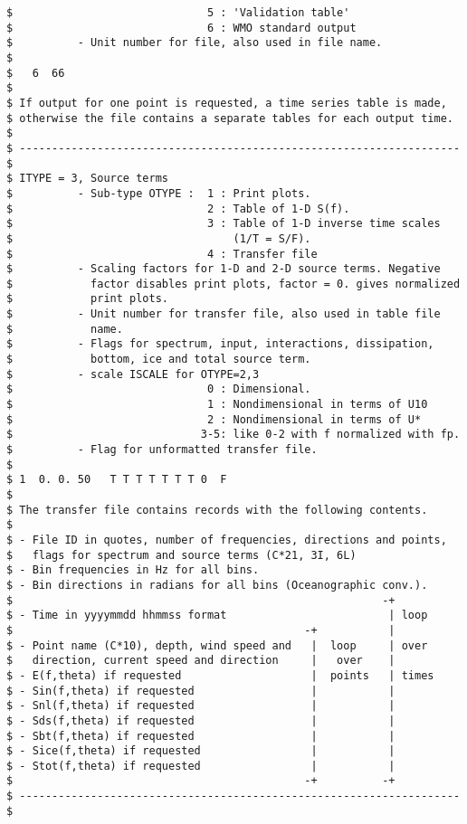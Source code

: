 \begin{footnotesize}
\begin{verbatim}
$                              5 : 'Validation table'
$                              6 : WMO standard output 
$          - Unit number for file, also used in file name.
$
$   6  66
$
$ If output for one point is requested, a time series table is made,
$ otherwise the file contains a separate tables for each output time.
$
$ -------------------------------------------------------------------- $
$ ITYPE = 3, Source terms
$          - Sub-type OTYPE :  1 : Print plots.
$                              2 : Table of 1-D S(f).
$                              3 : Table of 1-D inverse time scales
$                                  (1/T = S/F).
$                              4 : Transfer file
$          - Scaling factors for 1-D and 2-D source terms. Negative
$            factor disables print plots, factor = 0. gives normalized
$            print plots.
$          - Unit number for transfer file, also used in table file
$            name.
$          - Flags for spectrum, input, interactions, dissipation,
$            bottom, ice and total source term.
$          - scale ISCALE for OTYPE=2,3
$                              0 : Dimensional.
$                              1 : Nondimensional in terms of U10
$                              2 : Nondimensional in terms of U*
$                             3-5: like 0-2 with f normalized with fp.
$          - Flag for unformatted transfer file.
$
$ 1  0. 0. 50   T T T T T T T 0  F
$
$ The transfer file contains records with the following contents.
$
$ - File ID in quotes, number of frequencies, directions and points,
$   flags for spectrum and source terms (C*21, 3I, 6L)
$ - Bin frequencies in Hz for all bins.
$ - Bin directions in radians for all bins (Oceanographic conv.).
$                                                         -+
$ - Time in yyyymmdd hhmmss format                         | loop
$                                             -+           |
$ - Point name (C*10), depth, wind speed and   |  loop     | over
$   direction, current speed and direction     |   over    |
$ - E(f,theta) if requested                    |  points   | times
$ - Sin(f,theta) if requested                  |           |
$ - Snl(f,theta) if requested                  |           |
$ - Sds(f,theta) if requested                  |           |
$ - Sbt(f,theta) if requested                  |           |
$ - Sice(f,theta) if requested                 |           |
$ - Stot(f,theta) if requested                 |           |
$                                             -+          -+
$ -------------------------------------------------------------------- $

\end{verbatim}
\end{footnotesize}
